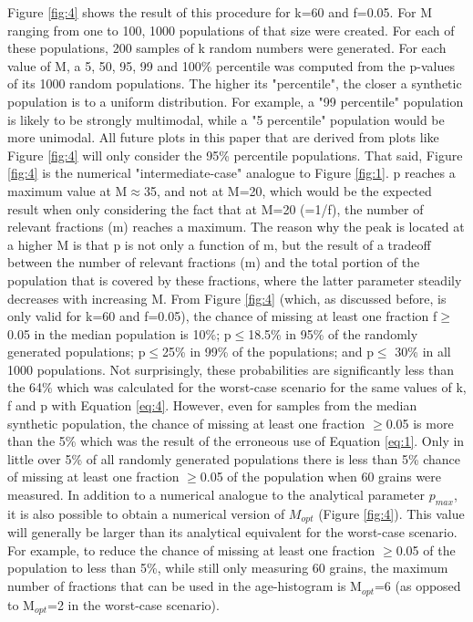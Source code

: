 \documentclass[12]{article}
\begin{document}
Figure \ref{fig:4}  shows the  result of this  procedure for  k=60 and
f=0.05.  For M ranging from one  to 100, 1000 populations of that size
were created.  For each of  these populations, 200 samples of k random
numbers were  generated.  For  each value of  M, a  5, 50, 95,  99 and
100\% percentile  was computed  from the p-values  of its  1000 random
populations.   The higher  its  "percentile", the  closer a  synthetic
population  is  to  a   uniform  distribution.   For  example,  a  "99
percentile" population is likely to be strongly multimodal, while a "5
percentile" population  would be more  unimodal.  All future  plots in
this paper  that are derived  from plots like Figure  \ref{fig:4} will
only  consider the  95\%  percentile populations.   That said,  Figure
\ref{fig:4}  is the numerical  "intermediate-case" analogue  to Figure
\ref{fig:1}.  p  reaches a maximum  value at M$\approx$35, and  not at
M=20, which  would be  the expected result  when only  considering the
fact that at M=20 (=1/f), the number of relevant fractions (m) reaches
a maximum.  The reason why the peak is located at a higher M is that p
is not only a function of m,  but the result of a tradeoff between the
number  of  relevant  fractions  (m)  and the  total  portion  of  the
population  that  is covered  by  these  fractions,  where the  latter
parameter   steadily  decreases  with   increasing  M.    From  Figure
\ref{fig:4} (which,  as discussed before,  is only valid for  k=60 and
f=0.05), the  chance of missing  at least one fraction  f$\geq$0.05 in
the median population  is 10\%; p$\leq$18.5\% in 95\%  of the randomly
generated  populations; p$\leq$25\%  in 99\%  of the  populations; and
p$\leq$  30\%  in  all  1000  populations.   Not  surprisingly,  these
probabilities  are   significantly  less  than  the   64\%  which  was
calculated for the worst-case scenario for the same values of k, f and
p with Equation \ref{eq:4}.  However, even for samples from the median
synthetic  population, the  chance of  missing at  least  one fraction
$\geq$0.05 is more than the 5\%  which was the result of the erroneous
use of Equation  \ref{eq:1}.  Only in little over  5\% of all randomly
generated  populations there  is less  than 5\%  chance of  missing at
least one  fraction $\geq$0.05 of  the population when 60  grains were
measured.   In addition  to  a numerical  analogue  to the  analytical
parameter $p_{max}$, it is also possible to obtain a numerical version
of  $M_{opt}$  (Figure \ref{fig:4}).   This  value  will generally  be
larger  than its  analytical equivalent  for the  worst-case scenario.
For example,  to reduce  the chance of  missing at least  one fraction
$\geq$0.05  of the  population  to  less than  5\%,  while still  only
measuring 60 grains, the maximum  number of fractions that can be used
in the age-histogram is M$_{opt}$=6  (as opposed to M$_{opt}$=2 in the
worst-case scenario).
\end{document}
